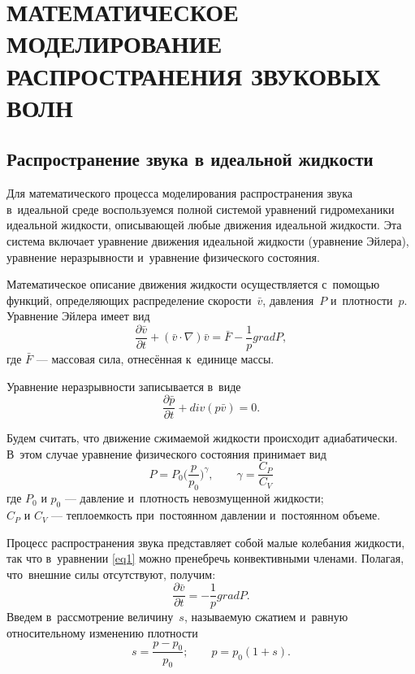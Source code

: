 \section{МАТЕМАТИЧЕСКОЕ МОДЕЛИРОВАНИЕ РАСПРОСТРАНЕНИЯ ЗВУКОВЫХ ВОЛН}

\newpage
\subsection{Распространение звука в идеальной жидкости}

Для математического процесса моделирования распространения звука в~идеальной среде воспользуемся полной системой уравнений гидромеханики идеальной жидкости, описывающей любые движения идеальной жидкости. Эта система включает уравнение движения идеальной жидкости (уравнение Эйлера), уравнение неразрывности и~уравнение физического состояния.

Математическое описание движения жидкости осуществляется с~помощью функций, определяющих распределение скорости~$\bar{v}$, давления~$P$ и~плотности~$p$. Уравнение Эйлера имеет вид
\begin{equation}\label{eq1}
\frac{\partial \bar{v}}{\partial t} + (\bar{v} \cdot \nabla)\bar{v} = \bar F - \frac{1}{p} grad P,
\end{equation}
где $\bar F$ --- массовая сила, отнесённая к~единице массы.

Уравнение неразрывности записывается в~виде
\begin{equation}\label{eq2}
\frac{\partial \bar{p}}{\partial t} +  div (p \bar{v}) = 0.
\end{equation}

Будем считать, что движение сжимаемой жидкости происходит адиабатически. В~этом случае уравнение физического состояния принимает вид
\begin{equation}\label{eq3}
P=P_0\bigg(\frac{p}{p_0}\bigg)^\gamma, \qquad \gamma=\frac{C_P}{C_V}
\end{equation}
где $P_0$ и $p_0$ --- давление и~плотность невозмущенной жидкости; \\
 $C_P$ и $C_V$ --- теплоемкость при~постоянном давлении и~постоянном объеме.

Процесс распространения звука представляет собой малые колебания жидкости, так что в~уравнении \eqref{eq1} можно пренебречь конвективными членами. Полагая, что~внешние силы отсутствуют, получим:
\begin{equation}\label{eq4}
\frac{\partial \bar{v}}{\partial t} = - \frac{1}{p} grad P.
\end{equation}
Введем в~рассмотрение величину~$s$, называемую сжатием и~равную относительному изменению плотности
\begin{equation}\label{eq5}
s=\frac{p - p_0}{p_0}; \qquad p = p_0 (1+s).
\end{equation}

